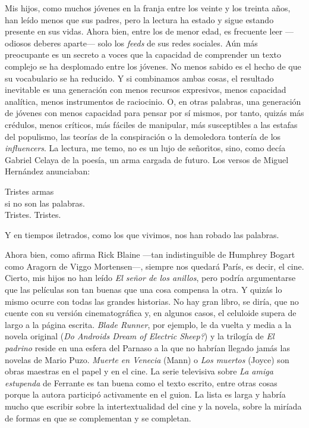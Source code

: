 Mis hijos, como muchos jóvenes en la franja entre los veinte y los treinta años, han leído menos que sus padres, pero la lectura ha estado y sigue estando presente en sus vidas. Ahora bien, entre los de menor edad, es frecuente leer ---odiosos deberes aparte--- solo los \emph{feeds} de sus redes sociales. Aún más preocupante es un secreto a voces que la capacidad de comprender un texto complejo se ha desplomado entre los jóvenes. No menos sabido es el hecho de que su vocabulario se ha reducido. Y si combinamos ambas cosas, el resultado inevitable es una generación con menos recursos expresivos, menos capacidad analítica, menos instrumentos de raciocinio. O, en otras palabras, una generación de jóvenes con menos capacidad para pensar por sí mismos, por tanto, quizás más crédulos, menos críticos, más fáciles de manipular, más susceptibles a las estafas del populismo, las teorías de la conspiración o la demoledora tontería de los \emph{influencers}. La lectura, me temo, no es un lujo de señoritos, sino, como decía Gabriel Celaya de la poesía, un arma cargada de futuro. Los versos de Miguel Hernández anunciaban:

\begin{versocita}
Tristes armas\\
si no son las palabras.\\
Tristes. Tristes.
\end{versocita}

Y en tiempos iletrados, como los que vivimos, nos han robado las palabras.

Ahora bien, como afirma Rick Blaine ---tan indistinguible de Humphrey Bogart como Aragorn de Viggo Mortensen---, siempre nos quedará París, es decir, el cine. Cierto, mis hijos no han leído \emph{El señor de los anillos}, pero podría argumentarse que las películas son tan buenas que una cosa compensa la otra. Y quizás lo mismo ocurre con todas las grandes historias. No hay gran libro, se diría, que no cuente con su versión cinematográfica y, en algunos casos, el celuloide supera de largo a la página escrita. \emph{Blade Runner}, por ejemplo, le da vuelta y media a la novela original (\emph{Do Androids Dream of Electric Sheep?}) y la trilogía de \emph{El padrino} reside en una esfera del Parnaso a la que no habrían llegado jamás las novelas de Mario Puzo. \emph{Muerte en Venecia} (Mann) o \emph{Los muertos} (Joyce) son obras maestras en el papel y en el cine. La serie televisiva sobre \emph{La amiga estupenda} de Ferrante es tan buena como el texto escrito, entre otras cosas porque la autora participó activamente en el guion. La lista es larga y habría mucho que escribir sobre la intertextualidad del cine y la novela, sobre la miríada de formas en que se complementan y se completan.

